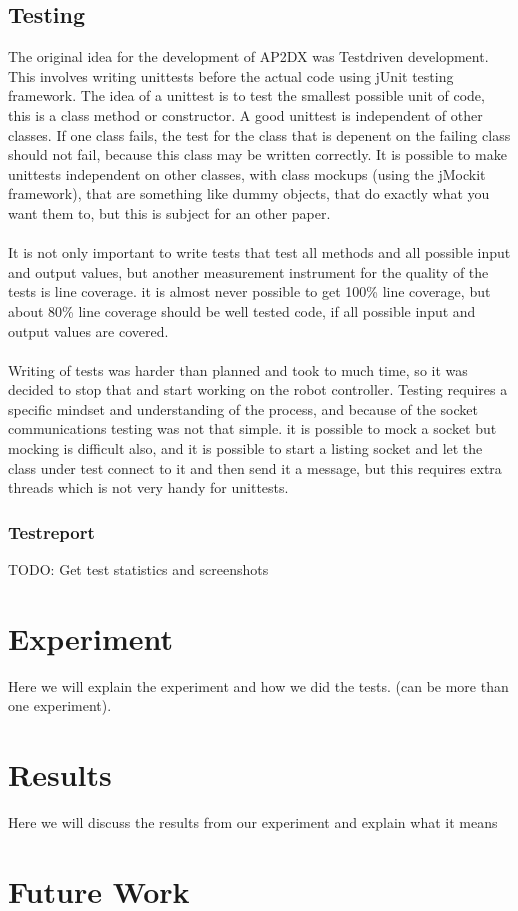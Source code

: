 \documentclass[titlepage, a4paper,10pt]{article}
\begin{document}
\subsection{Testing}
The original idea for the development of AP2DX was Testdriven development. This involves writing unittests before the actual code using jUnit testing framework. The idea of a unittest is to test the smallest possible unit of code, this is a class method or constructor. A good unittest is independent of other classes. If one class fails, the test for the class that is depenent on the failing class should not fail, because this class may be written correctly. It is possible to make unittests independent on other classes, with class mockups (using the jMockit framework), that are something like dummy objects, that do exactly what you want them to, but this is subject for an other paper.
\\\\
It is not only important to write tests that test all methods and all possible input and output values, but another measurement instrument for the quality of the tests is line coverage. it is almost never possible to get 100\% line coverage, but about 80\% line coverage should be well tested code, if all possible input and output values are covered.
\\\\
Writing of tests was harder than planned and took to much time, so it was decided to stop that and start working on the robot controller. Testing requires a specific mindset and understanding of the process, and because of the socket communications testing was not that simple. it is possible to mock a socket but mocking is difficult also, and it is possible to start a listing socket and let the class under test connect to it and then send it a message, but this requires extra threads which is not very handy for unittests.

\subsubsection{Testreport}
TODO: Get test statistics and screenshots

\newpage

\section{Experiment}
Here we will explain the experiment and how we did the tests. (can be more than one experiment).

\newpage

\section{Results}
Here we will discuss the results from our experiment and explain what it means

\newpage

\section{Future Work}

\end{document}
